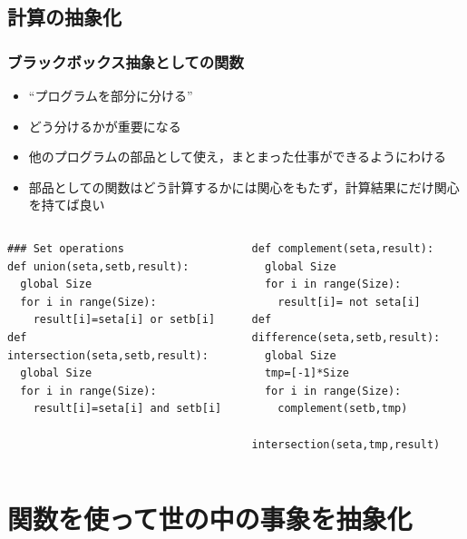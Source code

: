 \subsection{計算の抽象化}
\begin{frame}
\frametitle{ブラックボックス抽象としての関数}
  \begin{itemize}
\item ``プログラムを部分に分ける''
\item どう分けるかが重要になる
\item 他のプログラムの部品として使え，まとまった仕事ができるようにわける
\item 部品としての関数はどう計算するかには関心をもたず，計算結果にだけ関心を持てば良い
  \end{itemize}
  \begin{columns}[t]
    \begin{column}{0.45\textwidth}
      \begin{lstlisting}[caption={集合演算},label=lst:fun_abst]
### Set operations
def union(seta,setb,result):
  global Size
  for i in range(Size):
    result[i]=seta[i] or setb[i]
def intersection(seta,setb,result):
  global Size
  for i in range(Size):
    result[i]=seta[i] and setb[i]
      \end{lstlisting}
    \end{column}
    \begin{column}{0.45\textwidth}
      \begin{lstlisting}[caption={集合演算},label=lst:fun_abst2,firstnumber=last]
def complement(seta,result):
  global Size
  for i in range(Size):
    result[i]= not seta[i]
def difference(seta,setb,result):
  global Size
  tmp=[-1]*Size
  for i in range(Size):
    complement(setb,tmp)
    intersection(seta,tmp,result)
      \end{lstlisting}
    \end{column}
  \end{columns}
\end{frame}
%
%
\section{関数を使って世の中の事象を抽象化}
